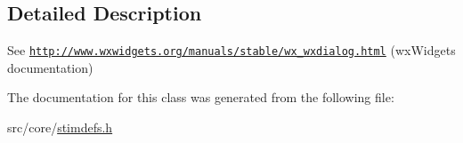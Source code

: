 \subsection{Detailed Description}
See \href{http://www.wxwidgets.org/manuals/stable/wx_wxdialog.html}{\tt http://www.wxwidgets.org/manuals/stable/wx\_\-wxdialog.html} (wxWidgets documentation) 

The documentation for this class was generated from the following file:\begin{DoxyCompactItemize}
\item 
src/core/\hyperlink{stimdefs_8h}{stimdefs.h}\end{DoxyCompactItemize}
